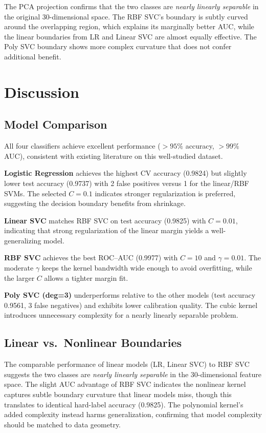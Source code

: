 \documentclass[10pt, letterpaper]{article}
\begin{document}
The PCA projection confirms that the two classes are \emph{nearly linearly separable} in the original 30-dimensional space.
The RBF SVC's boundary is subtly curved around the overlapping region, which explains its marginally better AUC, while the linear boundaries from LR and Linear SVC are almost equally effective.
The Poly SVC boundary shows more complex curvature that does not confer additional benefit.

\section{Discussion}

\subsection{Model Comparison}

All four classifiers achieve excellent performance ($>95\%$ accuracy, $>99\%$ AUC), consistent with existing literature on this well-studied dataset.

\textbf{Logistic Regression} achieves the highest CV accuracy (0.9824) but slightly lower test accuracy (0.9737) with 2 false positives versus 1 for the linear/RBF SVMs.
The selected $C{=}0.1$ indicates stronger regularization is preferred, suggesting the decision boundary benefits from shrinkage.

\textbf{Linear SVC} matches RBF SVC on test accuracy (0.9825) with $C{=}0.01$, indicating that strong regularization of the linear margin yields a well-generalizing model.

\textbf{RBF SVC} achieves the best ROC--AUC (0.9977) with $C{=}10$ and $\gamma{=}0.01$.
The moderate $\gamma$ keeps the kernel bandwidth wide enough to avoid overfitting, while the larger $C$ allows a tighter margin fit.

\textbf{Poly SVC (deg=3)} underperforms relative to the other models (test accuracy 0.9561, 3 false negatives) and exhibits lower calibration quality.
The cubic kernel introduces unnecessary complexity for a nearly linearly separable problem.

\subsection{Linear vs.\ Nonlinear Boundaries}

The comparable performance of linear models (LR, Linear SVC) to RBF SVC suggests the two classes are \emph{nearly linearly separable} in the 30-dimensional feature space.
The slight AUC advantage of RBF SVC indicates the nonlinear kernel captures subtle boundary curvature that linear models miss, though this translates to identical hard-label accuracy (0.9825).
The polynomial kernel's added complexity instead harms generalization, confirming that model complexity should be matched to data geometry.
\end{document}
